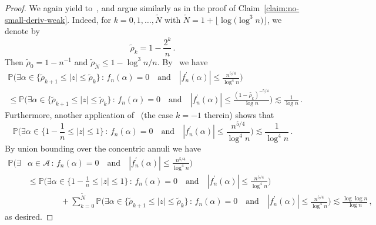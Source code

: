 \documentclass[11pt]{amsart}
\theoremstyle{remark}
\theoremstyle{definition}
\newcommand{\bP}{\mathbb P}
\begin{document}
    \begin{proof}
        We again yield to~\cite[Lemma~4.3]{Michelen-Yakir-root-separation}, and argue similarly as in the proof of Claim~\ref{claim:no-small-deriv-weak}. Indeed, for $k=0,1,\ldots,\widetilde  N$ with $\widetilde{N} = 1+\lfloor \log \big(\log^3 n\big)\rfloor$, we denote by
        \[
        \widetilde \rho_k = 1-\frac{2^{k}}{n} \, .
        \]
        Then $\widetilde \rho_0 = 1-n^{-1}$ and $\widetilde \rho_{\widetilde{N}} \le 1- \log^3n/n$. 
        By~\cite[Lemma~4.3]{Michelen-Yakir-root-separation}
        we have
               \begin{multline*}
            \bP\Big(\exists \alpha \in \big\{\widetilde \rho_{k+1} \le |z| \le \widetilde\rho_k \big\}  \, : \, f_n(\alpha)=0 \quad  \text{and} \quad |f_n^\prime(\alpha)|\le \frac{n^{5/4}}{\log^4n} \Big) \\ \le \bP\Big(\exists \alpha \in \big\{\widetilde \rho_{k+1} \le |z| \le \widetilde\rho_k \big\}  \, : \, f_n(\alpha)=0 \quad  \text{and} \quad |f_n^\prime(\alpha)|\le \frac{(1-\widetilde{\rho_k})^{-5/4}}{\log n} \Big) \lesssim \frac{1}{\log n} \, .
        \end{multline*}
        Furthermore, another application of~\cite[Lemma~4.3]{Michelen-Yakir-root-separation} (the case $k=-1$ therein) shows that
        \begin{equation*}
            \bP\Big(\exists \alpha\in \Big\{1-\frac{1}{n} \le |z|\le 1 \Big\} \, : \, f_n(\alpha) = 0 \quad  \text{and} \quad |f_n^\prime(\alpha)| \le \frac{n^{5/4}}{\log^4 n} \Big) \lesssim \frac{1}{\log^4 n} \, . 
        \end{equation*}
        By union bounding over the concentric annuli we have
        \begin{align*}
             \bP\Big(\exists &\alpha\in \mathcal{A}  \, : \, f_n(\alpha) = 0 \quad  \text{and} \quad |f_n^\prime(\alpha)| \le \frac{n^{5/4}}{\log^4 n} \Big) \\ & \le \bP\Big(\exists \alpha\in \Big\{1-\frac{1}{n} \le |z|\le 1 \Big\} \, : \, f_n(\alpha) = 0 \quad  \text{and} \quad |f_n^\prime(\alpha)| \le \frac{n^{5/4}}{\log^4 n} \Big) \\ & \qquad \qquad +  \sum_{k=0}^{\widetilde{N}}  \bP\Big(\exists \alpha \in \big\{\widetilde \rho_{k+1} \le |z| \le \widetilde\rho_k \big\}  \, : \, f_n(\alpha)=0 \quad  \text{and} \quad |f_n^\prime(\alpha)|\le \frac{n^{5/4}}{\log^4n} \Big)  \lesssim \frac{\log \log n}{\log n} \, ,
        \end{align*}
        as desired.
    \end{proof}
\end{document}
